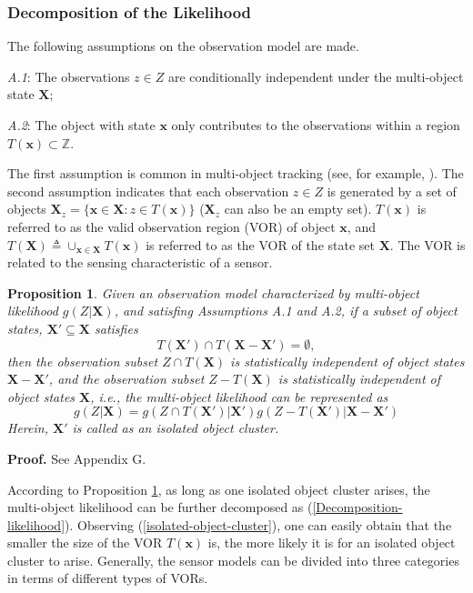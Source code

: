 \documentclass[journal]{IEEEtran}
\newcommand{\bX}{{\mathbf X}}
\newcommand{\bx}{{\mathbf x}}
\newtheorem{Pro}{Proposition}
\newcommand{\proproof}[1]{\noindent\textbf{Proof. } See Appendix #1.}
\begin{document}
{\subsubsection{Decomposition of the Likelihood
} 
The following assumptions on the observation model are made.


\textit{A.1}: The observations $z\in Z$ are  conditionally independent under   the multi-object state $\bX$;

\textit{A.2}: The object with state $\bx$  only contributes to the observations within a region $T(\bx)\subset\mathbb{Z}$.


The first assumption is common in multi-object tracking (see, for example, \cite{refr:MeMber_filter,refr:tbd-5,refr:superpositional-2}).  
The second assumption indicates that each observation $z\in Z$ is generated by a set of objects $\bX_z=\{\bx\in\bX: z\in T(\bx)\}$ ($\bX_z$  can also be an empty  set).  $T(\bx)$ is referred to as the valid observation region (VOR) of  object $\bx$, and $T(\bX)\triangleq \cup_{\bx\in\bX} T(\bx)$ is referred to as the VOR of the state set $\bX$.  The VOR is related to the sensing characteristic of a sensor.

\begin{Pro}\label{pro:7}
Given an observation model characterized by multi-object likelihood $g(Z|\bX)$,  and satisfing Assumptions A.1 and A.2, if a subset of object states,  $\bX'\subseteq\bX$ satisfies 
\begin{equation}\label{isolated-object-cluster}
T(\bX')\cap T(\bX-\bX')=\emptyset,
\end{equation}
 then the observation subset $Z\cap T(\bX)$ is statistically independent of  object states $\bX-\bX'$, and the observation subset $Z-T(\bX)$ is statistically independent of  object states $\bX$, i.e., the multi-object likelihood can be represented as
\begin{equation}\label{Decomposition-likelihood}
g(Z|\bX)=g(Z\cap T(\bX')|\bX')g(Z- T(\bX')|\bX-\bX')
\end{equation} 
Herein, $\bX'$ is called as an  isolated object cluster. 
\end{Pro}
\proproof{G}


According to Proposition \ref{pro:7},  as long as  one isolated object cluster arises,  the multi-object likelihood can be further  decomposed as (\ref{Decomposition-likelihood}). Observing (\ref{isolated-object-cluster}), one can easily obtain that the smaller the size of the VOR $T(\bx)$ is, the more likely it is  for an isolated object cluster to arise. Generally, the sensor models can be divided into three categories in terms of different types of VORs. 
 

}
\end{document}
